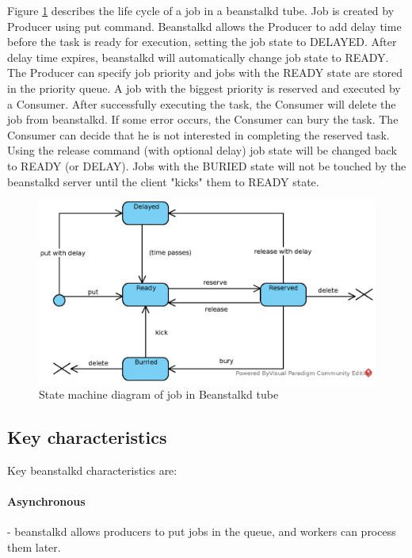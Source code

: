     Figure \ref{fig:beanstalkdJobSM} describes the life cycle of a job in a beanstalkd tube. Job is created by Producer using put command. Beanstalkd allows the Producer to add delay time before the task is ready for execution, setting the job state to DELAYED. After delay time expires, beanstalkd will automatically change job state to READY. The Producer can specify job priority and jobs with the READY state are stored in the priority queue. A job with the biggest priority is reserved and executed by a Consumer. After successfully executing the task, the Consumer will delete the job from beanstalkd. If some error occurs, the Consumer can bury the task. The Consumer can decide that he is not interested in completing the reserved task. Using the release command (with optional delay) job state will be changed back to READY (or DELAY). Jobs with the BURIED state will not be touched by the beanstalkd server until the client "kicks" them to READY state.

    \begin{figure}[hbt]
        \centering
        \includegraphics[width=1\textwidth]{obrazky-figures/beanstalkd-job-states.eps}
        \caption{State machine diagram of job in Beanstalkd tube}
        \label{fig:beanstalkdJobSM}
    \end{figure}


    \subsection{Key characteristics}
    Key beanstalkd characteristics are:

    \paragraph{Asynchronous}- beanstalkd allows producers to put jobs in the queue, and workers can process them later.
